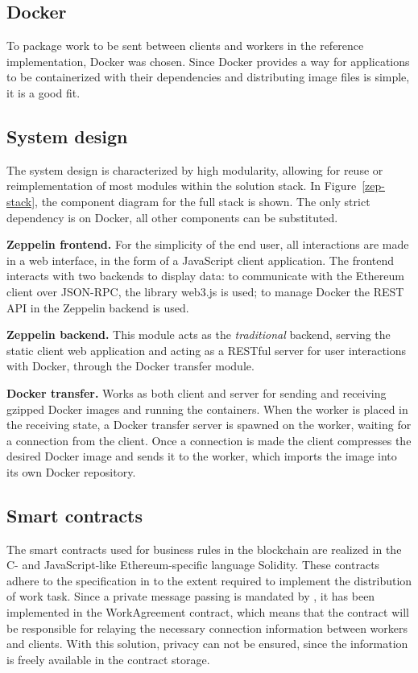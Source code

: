 \subsection{Docker}
To package work to be sent between clients and workers in the reference implementation, Docker was chosen. Since Docker provides a way for applications to be containerized with their dependencies and distributing image files is simple, it is a good fit.

\subsection{System design}
The system design is characterized by high modularity, allowing for reuse or reimplementation of most modules within the solution stack. In Figure~\ref{zep-stack}, the component diagram for the full stack is shown. The only strict dependency is on Docker, all other components can be substituted.

\textbf{Zeppelin frontend.} For the simplicity of the end user, all interactions are made in a web interface, in the form of a JavaScript client application. The frontend interacts with two backends to display data: to communicate with the Ethereum client over JSON-RPC, the library web3.js is used; to manage Docker the REST API in the Zeppelin backend is used.

\textbf{Zeppelin backend.} This module acts as the \textit{traditional} backend, serving the static client web application and acting as a RESTful server for user interactions with Docker, through the Docker transfer module.

\textbf{Docker transfer.} Works as both client and server for sending and receiving gzipped Docker images and running the containers. When the worker is placed in the receiving state, a Docker transfer server is spawned on the worker, waiting for a connection from the client. Once a connection is made the client compresses the desired Docker image and sends it to the worker, which imports the image into its own Docker repository.

\subsection{Smart contracts}
The smart contracts used for business rules in the blockchain are realized in the C- and JavaScript-like Ethereum-specific language Solidity. These contracts adhere to the specification in  to the extent required to implement the distribution of work task. Since a private message passing is mandated by , it has been implemented in the WorkAgreement contract, which means that the contract will be responsible for relaying the necessary connection information between workers and clients. With this solution, privacy can not be ensured, since the information is freely available in the contract storage.

